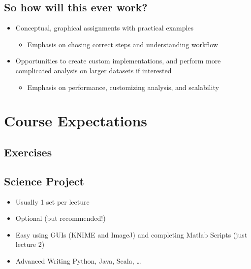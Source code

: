 \documentclass[letterpaper,10pt,english]{sphinxmanual}
\begin{document}
\section{So how will this ever work?}
\label{\detokenize{01-Introduction:so-how-will-this-ever-work}}
\sphinxAtStartPar
{}
\begin{itemize}
\item {} 
\sphinxAtStartPar
Conceptual, graphical assignments with practical examples
\begin{itemize}
\item {} 
\sphinxAtStartPar
Emphasis on chosing correct steps and understanding workflow

\end{itemize}

\item {} 
\sphinxAtStartPar
Opportunities to create custom implementations, and perform more complicated analysis on larger datasets if interested
\begin{itemize}
\item {} 
\sphinxAtStartPar
Emphasis on performance, customizing analysis, and scalability

\end{itemize}

\end{itemize}


\chapter{Course Expectations}
\label{\detokenize{01-Introduction:course-expectations}}



\section{Exercises}
\label{\detokenize{01-Introduction:center-exercises-center}}



\section{Science Project}
\label{\detokenize{01-Introduction:center-science-project-center}}



\begin{itemize}
\item {} 
\sphinxAtStartPar
Usually 1 set per lecture

\item {} 
\sphinxAtStartPar
Optional (but recommended!)

\item {} 
\sphinxAtStartPar
Easy \sphinxhyphen{} using GUIs (KNIME and ImageJ) and completing Matlab Scripts (just lecture 2)

\item {} 
\sphinxAtStartPar
Advanced \sphinxhyphen{} Writing Python, Java, Scala, …

\end{itemize}
\end{document}
